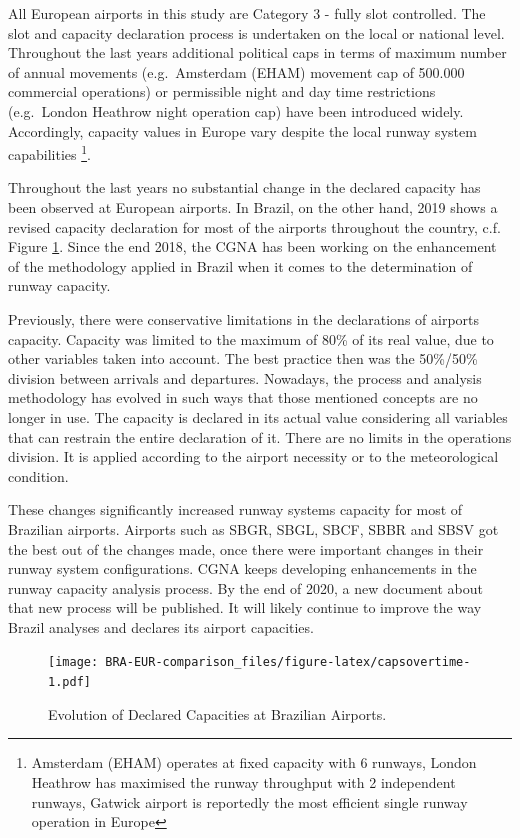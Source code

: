 \documentclass[
]{book}
\begin{document}
All European airports in this study are Category 3 - fully slot controlled.
The slot and capacity declaration process is undertaken on the local or national level.
Throughout the last years additional political caps in terms of maximum number of annual movements (e.g.~Amsterdam (EHAM) movement cap of 500.000 commercial operations) or permissible night and day time restrictions (e.g.~London Heathrow night operation cap) have been introduced widely.
Accordingly, capacity values in Europe vary despite the local runway system capabilities \footnote{Amsterdam (EHAM) operates at fixed capacity with 6 runways, London Heathrow has maximised the runway throughput with 2 independent runways, Gatwick airport is reportedly the most efficient single runway operation in Europe}.

Throughout the last years no substantial change in the declared capacity has been observed at European airports.
In Brazil, on the other hand, 2019 shows a revised capacity declaration for most of the airports throughout the country, c.f. Figure \ref{fig:capsovertime}.
Since the end 2018, the CGNA has been working on the enhancement of the methodology applied in Brazil when it comes to the determination of runway capacity.

Previously, there were conservative limitations in the declarations of airports capacity. Capacity was limited to the maximum of 80\% of its real value, due to other variables taken into account. The best practice then was the 50\%/50\% division between arrivals and departures. Nowadays, the process and analysis methodology has evolved in such ways that those mentioned concepts are no longer in use. The capacity is declared in its actual value considering all variables that can restrain the entire declaration of it.
There are no limits in the operations division.
It is applied according to the airport necessity or to the meteorological condition.

These changes significantly increased runway systems capacity for most of Brazilian airports.
Airports such as SBGR, SBGL, SBCF, SBBR and SBSV got the best out of the changes made, once there were important changes in their runway system configurations. CGNA keeps developing enhancements in the runway capacity analysis process.
By the end of 2020, a new document about that new process will be published. It will likely continue to improve the way Brazil analyses and declares its airport capacities.



\begin{figure}
\centering
\texttt{[image: BRA-EUR-comparison\_files/figure-latex/capsovertime-1.pdf]}
\caption{\label{fig:capsovertime}Evolution of Declared Capacities at Brazilian Airports.}
\end{figure}
\end{document}
